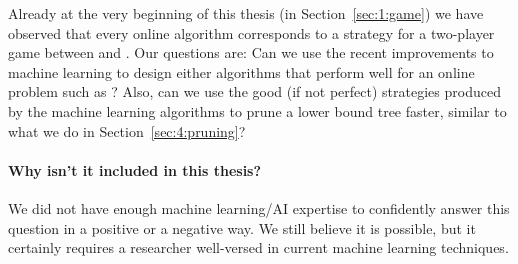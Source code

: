 \begin{enumerate}
Already at the very beginning of this thesis (in
Section~\ref{sec:1:game}) we have observed that every online algorithm
corresponds to a strategy for a two-player game between \algo and
\adversary. Our questions are: Can we use the recent improvements to
machine learning to design either algorithms that perform well for an
online problem such as \binstretch? Also, can we use the good (if not
perfect) strategies produced by the machine learning algorithms to
prune a lower bound tree faster, similar to what we do in
Section~\ref{sec:4:pruning}?

\paragraph{Why isn't it included in this thesis?} We did not have
enough machine learning/AI expertise to confidently answer this
question in a positive or a negative way. We still believe it is
possible, but it certainly requires a researcher well-versed in
current machine learning techniques.

\end{enumerate}